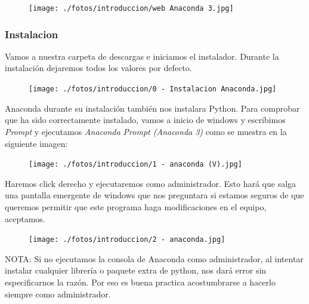 \documentclass[a4paper,10pt]{article}
\begin{document}
\begin{figure}[H]
\begin{center}
\texttt{[image: ./fotos/introduccion/web Anaconda 3.jpg]}
\end{center}
\end{figure}

\clearpage

\subsubsection{Instalacion}

Vamos a nuestra carpeta de descargas e iniciamos el instalador. Durante la instalación dejaremos todos los valores por defecto.


\begin{figure}[H]
\begin{center}
\texttt{[image: ./fotos/introduccion/0 - Instalacion Anaconda.jpg]}
\end{center}
\end{figure}

Anaconda durante su instalación también nos instalara Python. Para comprobar que ha sido correctamente instalado, vamos a inicio de windows y escribimos \textit{Prompt} y ejecutamos \textit{Anaconda Prompt (Anaconda 3)} como se muestra en la siguiente imagen:

\begin{center}
\begin{figure}[H]
\begin{center}
\texttt{[image: ./fotos/introduccion/1 - anaconda (V).jpg]}
\end{center}
\end{figure}
\vfill
\end{center}

Haremos click derecho y ejecutaremos como administrador. Esto hará que salga una pantalla emergente de windows que nos preguntara si estamos seguros de que queremos permitir que este programa haga modificaciones en el equipo, aceptamos. 

\begin{figure}[H]
\begin{center}
\texttt{[image: ./fotos/introduccion/2 - anaconda.jpg]}
\end{center}
\end{figure}

NOTA: Si no ejecutamos la consola de Anaconda como administrador, al intentar instalar cualquier librería o paquete extra de python, nos dará error sin especificarnos la razón. Por eso es buena practica acostumbrarse a hacerlo siempre como administrador.
\end{document}
